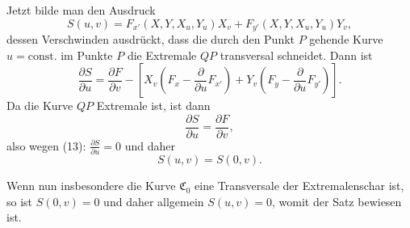 Jetzt bilde man den Ausdruck
\begin{equation*}\tag{14}
S(u,v)=F_{x'}(X,Y,X_u,Y_u)X_v+F_{y'}(X,Y,X_u,Y_u)Y_v,
\end{equation*}
dessen Verschwinden ausdrückt, dass die durch den Punkt $P$ gehende Kurve
$u=\text{const.}$ im Punkte $P$ die Extremale $QP$ transversal schneidet. Dann ist
\begin{equation*}\tag{15}
\frac{\partial S}{\partial u}=\frac{\partial F}{\partial v}
-\left[X_v\left(F_x-\frac{\partial}{\partial u}F_{x'}\right)+Y_v\left(F_y-\frac{\partial}{\partial u}F_{y'}\right)\right].
\end{equation*}
Da die Kurve $QP$ Extremale ist, ist dann
\begin{equation*}\tag{16}
\frac{\partial S}{\partial u}=\frac{\partial F}{\partial v},
\end{equation*}
also wegen (13): $\frac{\partial S}{\partial u}=0$ und daher
\begin{equation*}\tag{17}
S(u,v)=S(0,v).
\end{equation*}

Wenn nun insbesondere die Kurve $\mathfrak C_0$ eine Transversale der Extremalenschar
ist, so ist $S(0,v)=0$ und daher allgemein $S(u,v)=0$, womit der Satz
bewiesen ist.
\par\clearpage\endgroup
